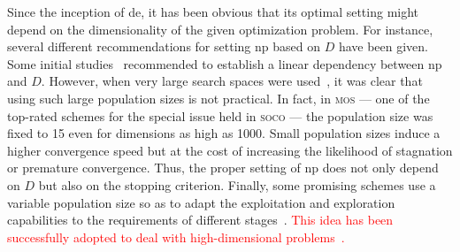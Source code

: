 \documentclass[review,3p]{elsarticle}
\newcommand{\DE}{{\sc de}}
\newcommand{\NP}{{\sc np}}
\begin{document}
Since the inception of \DE{}, it has been obvious that its optimal setting might depend on the dimensionality of the given optimization problem.
%
For instance, several different recommendations for setting \NP{} based on $D$ have been given.
%
Some initial studies~\cite{Gamperle:02,Zielinski:06} recommended to establish a linear dependency between \NP{} and $D$.
%
However, when very large search spaces were used~\cite{Olguin:13}, it was clear that using such large population sizes is not
practical.
%
%
In fact, in \textsc{mos} --- one of the top-rated schemes
for the special issue held in \textsc{soco} --- the population size was fixed to 15 even
for dimensions as high as 1000.
%
Small population sizes induce a higher convergence speed but at the cost of increasing the likelihood of
stagnation or premature convergence.
%
Thus, the proper setting of \NP{} does not only depend on $D$ but also on the stopping criterion.
%
%
%
Finally, some promising schemes use a variable population size so as to adapt the exploitation and exploration capabilities
to the requirements of different stages~\cite{Brest:08,Zhu:13}.
%
\textcolor{red}{
This idea has been successfully adopted to deal with high-dimensional problems~\cite{Brest:11}.}
%
\end{document}

